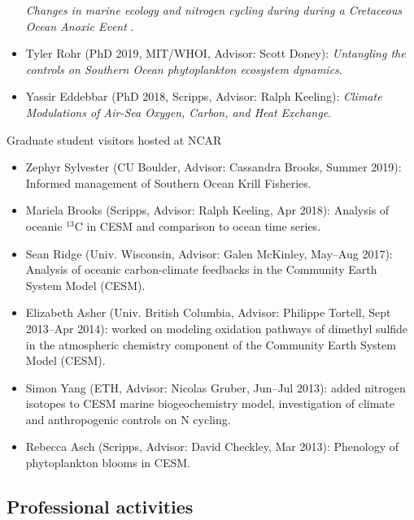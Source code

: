 \documentclass[11pt]{article}
\begin{document}
\begin{description}[style=multiline,leftmargin=0.5cm,font=\normalfont]
\begin{itemize}
	\textit{Changes in marine ecology and nitrogen cycling during during a Cretaceous Ocean Anoxic Event }.
	\item Tyler Rohr (PhD 2019, MIT/WHOI, Advisor: Scott Doney):
	\textit{Untangling the controls on Southern Ocean phytoplankton ecosystem dynamics}.
	\item Yassir Eddebbar (PhD 2018, Scripps, Advisor: Ralph Keeling):
	\textit{Climate Modulations of Air-Sea Oxygen, Carbon, and Heat Exchange}.
	\end{itemize}
\item Graduate student visitors hosted at NCAR
	\begin{itemize}
	\item Zephyr Sylvester (CU Boulder, Advisor: Cassandra Brooks, Summer 2019):
	  Informed management of Southern Ocean Krill Fisheries.
	\item Mariela Brooks (Scripps, Advisor: Ralph Keeling, Apr 2018):
	Analysis of oceanic {$^{13}$C} in CESM and comparison to ocean time series.
	\item Sean Ridge (Univ. Wisconsin, Advisor: Galen McKinley, May--Aug 2017):
		Analysis of oceanic carbon-climate feedbacks in the Community Earth System Model (CESM).
	\item Elizabeth Asher (Univ. British Columbia, Advisor: Philippe Tortell, Sept 2013--Apr 2014):
		worked on modeling oxidation pathways of dimethyl sulfide in the
		atmospheric chemistry component of the
		Community Earth System Model (CESM).
	\item Simon Yang (ETH, Advisor: Nicolas Gruber, Jun--Jul 2013):
	added nitrogen isotopes to CESM marine biogeochemistry model, investigation of
	climate and anthropogenic controls on N cycling.
	\item Rebecca Asch (Scripps, Advisor: David Checkley, Mar 2013):
	Phenology of phytoplankton blooms in CESM. \\
	\end{itemize}
\end{description}


\subsection*{Professional activities}
\end{document}
